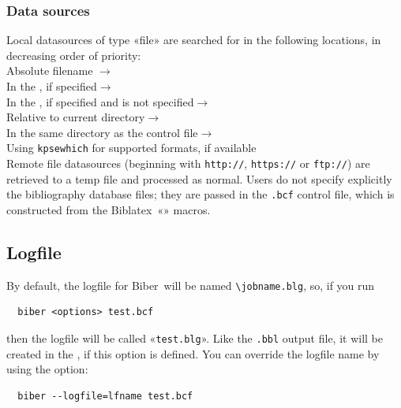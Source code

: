 \documentclass{ltxdockit}
\newcommand*{\biber}{Biber\xspace}
\newcommand*{\biblatex}{Biblatex\xspace}
\begin{document}
\subsubsection{Data sources}

Local datasources of type «file» are searched for in the following
locations, in decreasing order of priority:\\[2ex]

\noindent Absolute filename $\rightarrow$\\
\hspace*{1em}In the , if specified$\rightarrow$\\
\hspace*{2em}In the , if specified and
 is not specified$\rightarrow$\\
\hspace*{3em}Relative to current directory$\rightarrow$\\
\hspace*{4em}In the same directory as the control file$\rightarrow$\\
\hspace*{5em}Using \verb+kpsewhich+ for supported formats, if available\\[2ex]

\noindent Remote file datasources (beginning with \verb+http://+, \verb+https://+ or
\verb+ftp://+) are retrieved to a temp file and processed as normal. Users
do not specify explicitly the bibliography database files; they are passed
in the \verb+.bcf+ control file, which is constructed from the
\biblatex\ «\verb++» macros.

\subsection{Logfile}

By default, the logfile for \biber\ will be named \verb+\jobname.blg+,
so, if you run

\begin{verbatim}
  biber <options> test.bcf
\end{verbatim}

\noindent then the logfile will be called «\verb+test.blg+». Like the
\verb+.bbl+ output file, it will be created in the
, if this option is defined. You can
override the logfile name by using the  option:

\begin{verbatim}
  biber --logfile=lfname test.bcf
\end{verbatim}
\end{document}
